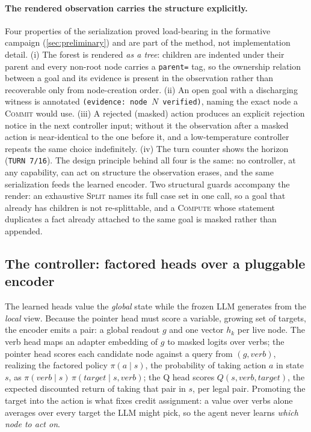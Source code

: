 \paragraph{The rendered observation carries the structure explicitly.}
Four properties of the serialization proved load-bearing in the formative
campaign (\cref{sec:preliminary}) and are part of the method, not
implementation detail. (i) The forest is rendered \emph{as a tree}:
children are indented under their parent and every non-root node carries a
\texttt{parent=} tag, so the ownership relation between a goal and its
evidence is present in the observation rather than recoverable only from
node-creation order. (ii) An open goal with a discharging witness is
annotated \texttt{(evidence: node $N$ verified)}, naming the exact node a
\textsc{Commit} would use. (iii) A rejected (masked) action produces an
explicit rejection notice in the next controller input; without it the
observation after a masked action is near-identical to the one before it,
and a low-temperature controller repeats the same choice indefinitely.
(iv) The turn counter shows the horizon (\texttt{TURN 7/16}). The design
principle behind all four is the same: no controller, at any capability,
can act on structure the observation erases, and the same serialization
feeds the learned encoder. Two structural guards accompany the
render: an exhaustive \textsc{Split} names its full case set in one call,
so a goal that already has children is not re-splittable, and a
\textsc{Compute} whose statement duplicates a fact already attached to the
same goal is masked rather than appended.

\subsection{The controller: factored heads over a pluggable encoder}
\label{sec:method-controller}

The learned heads value the \emph{global} state while the frozen LLM
generates from the \emph{local} view. Because the pointer head must score a
variable, growing set of targets, the encoder emits a pair: a global
readout $g$ and one vector $h_k$ per live node. The verb head maps an
adapter embedding of $g$ to masked logits over verbs; the pointer head
scores each candidate node against a query from $(g, \textit{verb})$,
realizing the factored policy $\pi(a \mid s)$, the probability of taking
action $a$ in state $s$, as $\pi(\textit{verb} \mid s)\,\pi(\textit{target}
\mid s, \textit{verb})$; the Q head scores
$Q(s, \textit{verb}, \textit{target})$, the expected discounted return of
taking that pair in $s$, per legal pair. Promoting the target into the action is what fixes credit
assignment: a value over verbs alone averages over every target the LLM
might pick, so the agent never learns \emph{which node to act on}.

